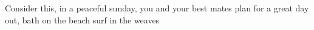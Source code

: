 Consider this, in a peaceful sunday, you and your best mates plan for a great day out, bath on the beach surf in the weaves  